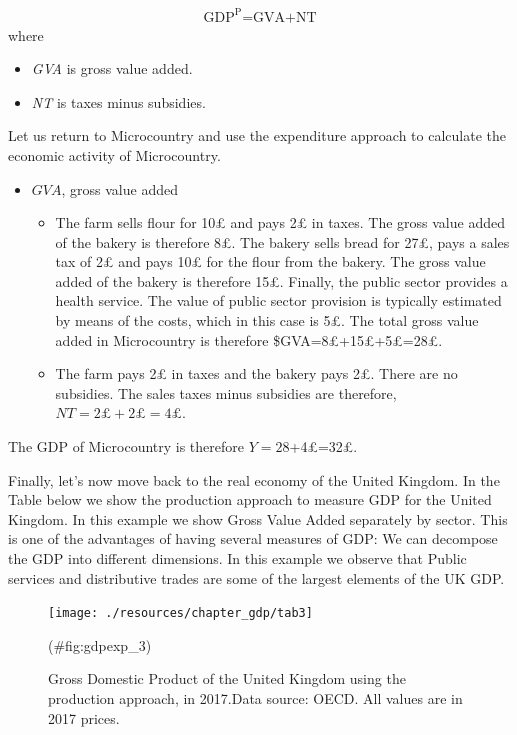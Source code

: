 \documentclass[
]{book}
\providecommand{\tightlist}{%
  \setlength{\itemsep}{0pt}\setlength{\parskip}{0pt}}
\begin{document}
\begin{align}
   \text{GDP}^{\text{P}} \text{=GVA+NT}
\end{align}
where

\begin{itemize}
\tightlist
\item
  \emph{GVA} is gross value added.
\item
  \emph{NT} is taxes minus subsidies.
\end{itemize}

Let us return to Microcountry and use the expenditure approach to calculate the economic activity of Microcountry.

\begin{itemize}
\item
  \(GVA\), gross value added

  \begin{itemize}
  \item
    The farm sells flour for 10£ and pays 2£ in taxes. The gross value added of the bakery is therefore 8£. The bakery sells bread for 27£, pays a sales tax of 2£ and pays 10£ for the flour from the bakery. The gross value added of the bakery is therefore 15£. Finally, the public sector provides a health service. The value of public sector provision is typically estimated by means of the costs, which in this case is 5£. The total gross value added in Microcountry is therefore \$GVA=8£+15£+5£=28£.
  \item
    The farm pays 2£ in taxes and the bakery pays 2£. There are no subsidies. The sales taxes minus subsidies are therefore, \(NT=2£+2£=4£\).
  \end{itemize}
\end{itemize}

The GDP of Microcountry is therefore \(Y=28\)+4£=32£.

Finally, let's now move back to the real economy of the United Kingdom. In the Table below we show the production approach to measure GDP for the United Kingdom. In this example we show Gross Value Added separately by sector. This is one of the advantages of having several measures of GDP: We can decompose the GDP into different dimensions. In this example we observe that Public services and distributive trades are some of the largest elements of the UK GDP.

\begin{figure}

{\centering \texttt{[image: ./resources/chapter\_gdp/tab3]} 

}

\caption{Gross Domestic Product of the United Kingdom using the production approach, in 2017.Data source: OECD. All values are in 2017 prices.}(\#fig:gdpexp_3)
\end{figure}
\end{document}
